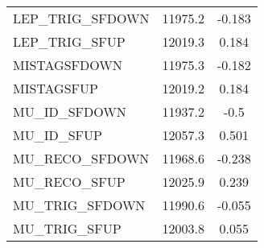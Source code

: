 \begin{center}
\begin{longtable}{|l|c|c|}
LEP\_TRIG\_SFDOWN  & 11975.2 & -0.183 \\
LEP\_TRIG\_SFUP  & 12019.3 & 0.184 \\
MISTAGSFDOWN  & 11975.3 & -0.182 \\
MISTAGSFUP  & 12019.2 & 0.184 \\
MU\_ID\_SFDOWN  & 11937.2 & -0.5 \\
MU\_ID\_SFUP  & 12057.3 & 0.501 \\
MU\_RECO\_SFDOWN  & 11968.6 & -0.238 \\
MU\_RECO\_SFUP  & 12025.9 & 0.239 \\
MU\_TRIG\_SFDOWN  & 11990.6 & -0.055 \\
MU\_TRIG\_SFUP  & 12003.8 & 0.055 \\
\hline \hline
\end{longtable}
\end{center}
\clearpage